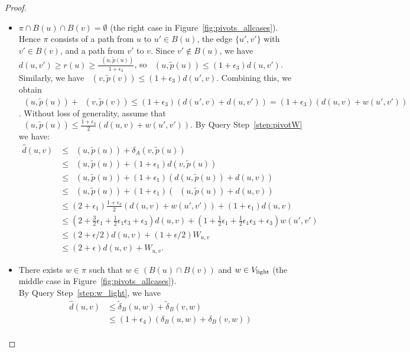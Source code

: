 \documentclass[11pt]{article}
\theoremstyle{definition}
\theoremstyle{remark}
\DeclareMathOperator{\dLNbunch}{\delta_{\tilde{B}}}
\begin{document}
\begin{proof}
    \begin{itemize}
        \item[Case 2:] $\pi\cap B(u)\cap B(v) =\emptyset$ (the right case in Figure~\ref{fig:pivots_allcases}).\\
        Hence $\pi$ consists of a path from $u$ to $u'\in B(u)$, the edge $\{u',v'\}$ with $v'\in B(v)$, and a path from $v'$ to $v$.
        Since $v'\notin B(u)$, we have $d(u,v')\geq   r(u) \geq \tfrac{\dLNbunch(u,\tilde p(u))}{1+\epsilon_3}$, so $\dLNbunch(u,\tilde p(u))\leq (1+\epsilon_3)d(u,v')$. Similarly, we have $\dLNbunch(v,\tilde p(v))\leq (1+\epsilon_3)d(u',v)$. Combining this, we obtain $\dLNbunch(u,\tilde p(u))+ \dLNbunch(v,\tilde p(v))\leq (1+\epsilon_3)(d(u',v)+d(u,v')) = (1+\epsilon_3)(d(u,v)+w(u',v'))$. Without loss of generality, assume that $\dLNbunch(u,\tilde p(u))\leq  \tfrac{1+\epsilon_3}{2}(d(u,v)+w(u',v'))$.  By Query Step~\ref{step:pivotW} we have:
        \begin{align*} 
            \hat{d}(u,v) &\leq \dLNbunch(u,\tilde p(u))+\delta_A(v,\tilde p(u)) \\
            &\leq \dLNbunch(u,\tilde p(u)) +(1+\epsilon_1)d(v,\tilde p(u))\\
            &\leq \dLNbunch(u,\tilde p(u))+(1+\epsilon_1)(d(u,\tilde p(u))+d(u,v))\\
            &\leq \dLNbunch(u,\tilde p(u))+(1+\epsilon_1)(\dLNbunch(u,\tilde p(u))+d(u,v))\\
            &\leq  (2+\epsilon_1)\tfrac{1+\epsilon_3}{2}(d(u,v)+w(u',v'))+(1+\epsilon_1)d(u,v)\\
            &\leq (2+\tfrac{3}{2}\epsilon_1+\tfrac{1}{2}\epsilon_1\epsilon_3+\epsilon_3)d(u,v)+(1+\tfrac{1}{2}\epsilon_1+\tfrac{1}{2}\epsilon_1\epsilon_3+\epsilon_3)w(u',v') \\
            &\leq (2+\epsilon/2)d(u,v)+(1+\epsilon/2)W_{u,v}\\
            &\leq (2+\epsilon)d(u,v)+W_{u,v}.
        \end{align*}
        \item[Case 3:] 
            There exists $w\in \pi$ such that $w\in (B(u)\cap B(v))$ and $w\in V_{\rm{light}}$ (the middle case in Figure~\ref{fig:pivots_allcases}).\\
            By Query Step~\ref{step:w_light}, we have 
            \begin{align*}
                \hat d(u,v) &\leq \tilde\delta_B(u,w)+\tilde\delta_B(v,w)\\
                &\leq (1+\epsilon_4)(\delta_B(u,w)+\delta_B(v,w))\\

\end{align*}
\end{itemize}
\end{proof}
\end{document}
